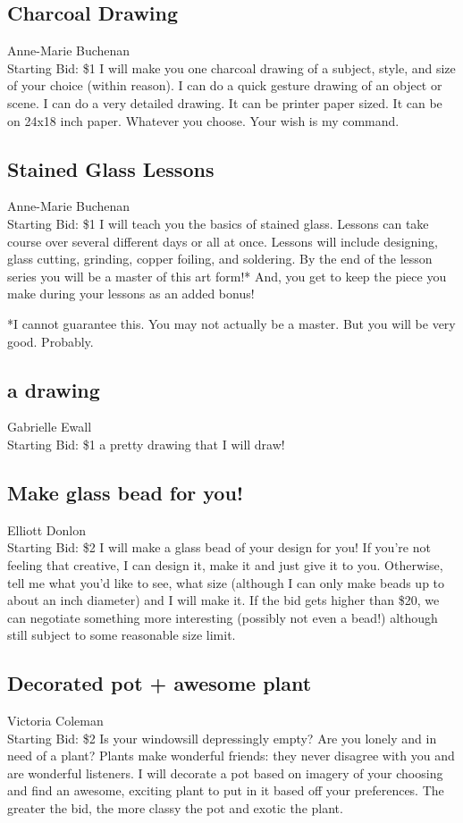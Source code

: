 \documentclass[11pt]{article}
\begin{document}
\subsection{Charcoal Drawing}
Anne-Marie Buchenan
\\
Starting Bid: \$1
\newline
I will make you one charcoal drawing of a subject, style, and size of your choice (within reason). I can do a quick gesture drawing of an object or scene. I can do a very detailed drawing. It can be printer paper sized. It can be on 24x18 inch paper. Whatever you choose. Your wish is my command.
\subsection{Stained Glass Lessons}
Anne-Marie Buchenan
\\
Starting Bid: \$1
\newline
I will teach you the basics of stained glass. Lessons can take course over several different days or all at once. Lessons will include designing, glass cutting, grinding, copper foiling, and soldering. By the end of the lesson series you will be a master of this art form!* And, you get to keep the piece you make during your lessons as an added bonus!

*I cannot guarantee this. You may not actually be a master. But you will be very good. Probably.
\subsection{a drawing}
Gabrielle Ewall
\\
Starting Bid: \$1
\newline
a pretty drawing that I will draw!
\subsection{Make glass bead for you!}
Elliott Donlon
\\
Starting Bid: \$2
\newline
I will make a glass bead of your design for you! If you're not feeling that creative, I can design it, make it and just give it to you. Otherwise, tell me what you'd like to see, what size (although I can only make beads up to about an inch diameter) and I will make it. If the bid gets higher than \$20, we can negotiate something more interesting (possibly not even a bead!) although still subject to some reasonable size limit.
\subsection{Decorated pot + awesome plant}
Victoria Coleman
\\
Starting Bid: \$2
\newline
Is your windowsill depressingly empty? Are you lonely and in need of a plant? Plants make wonderful friends: they never disagree with you and are wonderful listeners. I will decorate a pot based on imagery of your choosing and find an awesome, exciting plant to put in it based off your preferences. The greater the bid, the more classy the pot and exotic the plant.
\end{document}
